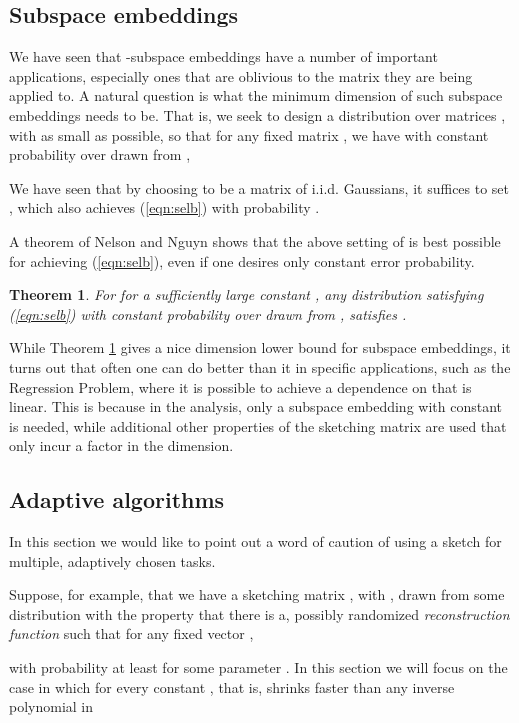 \documentclass[11pt]{article}
\newtheorem{theorem}{Theorem}
\begin{document}
\subsection{Subspace embeddings}\label{sec:seLB}
We have seen that -subspace embeddings have a number of important applications, 
especially ones that are oblivious to the matrix  they are being applied to. A natural
question is what the minimum dimension of such subspace embeddings needs to be. That is,
we seek to design a distribution  over  matrices , with  as small
as possible, so that for any
fixed  matrix , we have with constant probability over  drawn from ,

We have seen that by choosing  to be a matrix of i.i.d. Gaussians, it suffices to set
, which also achieves (\ref{eqn:selb}) with probability .

A theorem of Nelson and Nguyn \cite{nn14} shows that the above setting of  is best possible
for achieving (\ref{eqn:selb}), even if one desires only constant error probability. 

\begin{theorem}\label{thm:lbnn}
For  for a sufficiently large constant , 
any distribution  satisfying (\ref{eqn:selb}) with constant probability over 
drawn from , satisfies . 
\end{theorem}

While Theorem \ref{thm:lbnn} gives a nice dimension lower bound for subspace embeddings,
it turns out that often one can do better than it in specific applications, such as the  Regression
Problem, where it is possible to achieve a dependence on  that is linear. This is because in the
analysis, only a subspace embedding with constant  is needed, while additional
other properties of the sketching matrix  are used that only incur a  factor in the dimension.  

\subsection{Adaptive algorithms}\label{sec:adaptiveLower}
In this section we would like to point out a word of caution of using a sketch for multiple, adaptively chosen
tasks. 

Suppose, for example, that 
we have a  sketching matrix , with , drawn from some distribution
with the property that there is a, possibly randomized {\it reconstruction function}  
such that for any fixed vector , 

with probability at least  for some parameter . In this section we will focus
on the case in which  for every constant , that is,  shrinks faster
than any inverse polynomial in 
\end{document}
